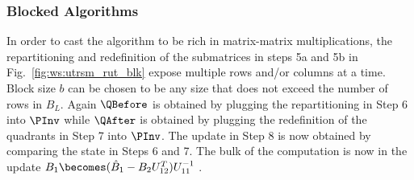 %
%
%
%

\subsubsection{Blocked Algorithms}

In order to cast the algorithm to be rich in matrix-matrix
multiplications, the repartitioning and redefinition of the
submatrices in steps 5a and 5b in Fig.~\ref{fig:ws:utrsm_rut_blk}
expose multiple rows and/or columns at a time.  Block size $ b $ can
be chosen to be any size that does not exceed the number of rows in $
B_L $.  Again $ \QBefore $ is obtained by plugging the repartitioning
in Step 6 into $ \PInv $ while $ \QAfter $ is obtained by plugging the
redefinition of the quadrants in Step 7 into $ \PInv $.  The update in
Step 8 is now obtained by comparing the state in Steps 6 and 7.  The
bulk of the computation is now in the update 
$ B_1 \becomes( \hat{B}_{1} - B_{2} U_{12}^T ) U_{11}^{-1} $ .


